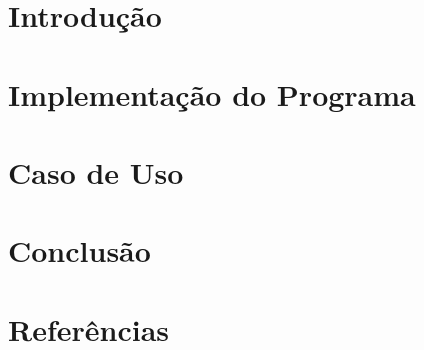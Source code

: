 \documentclass[12pt,a4paper]{article}
\begin{document}
%
%

\cleardoublepage
\section{Introdução}




\section{Implementação do Programa}

\section{Caso de Uso}
\section{Conclusão}
\section{Referências}
\end{document}
